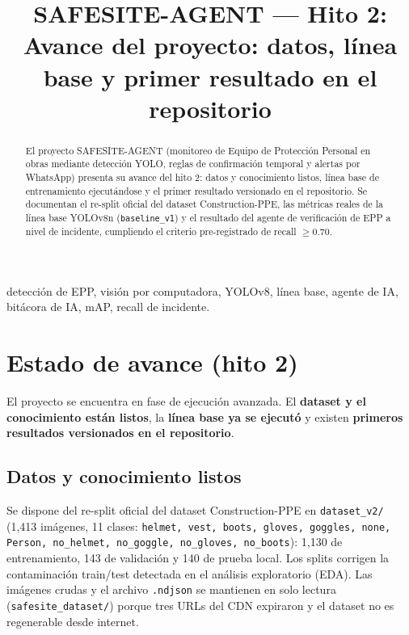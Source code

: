 \documentclass[conference,spanish]{IEEEtran}
\begin{document}
\title{SAFESITE-AGENT --- Hito 2:\\
\small Avance del proyecto: datos, línea base y primer resultado en el repositorio}

\author{
}

\maketitle

\begin{abstract}
El proyecto SAFESITE-AGENT (monitoreo de Equipo de Protección Personal en obras mediante detección YOLO, reglas de confirmación temporal y alertas por WhatsApp) presenta su avance del hito 2: datos y conocimiento listos, línea base de entrenamiento ejecutándose y el primer resultado versionado en el repositorio. Se documentan el re-split oficial del dataset Construction-PPE, las métricas reales de la línea base YOLOv8n (\texttt{baseline\_v1}) y el resultado del agente de verificación de EPP a nivel de incidente, cumpliendo el criterio pre-registrado de recall $\geq 0.70$.
\end{abstract}

\begin{IEEEkeywords}
detección de EPP, visión por computadora, YOLOv8, línea base, agente de IA, bitácora de IA, mAP, recall de incidente.
\end{IEEEkeywords}

\section{Estado de avance (hito 2)}

El proyecto se encuentra en fase de ejecución avanzada. El \textbf{dataset y el conocimiento están listos}, la \textbf{línea base ya se ejecutó} y existen \textbf{primeros resultados versionados en el repositorio}.

\subsection{Datos y conocimiento listos}
Se dispone del re-split oficial del dataset Construction-PPE en \texttt{dataset\_v2/} (1,413 imágenes, 11 clases: \texttt{helmet, vest, boots, gloves, goggles, none, Person, no\_helmet, no\_goggle, no\_gloves, no\_boots}): 1,130 de entrenamiento, 143 de validación y 140 de prueba local. Los splits corrigen la contaminación train/test detectada en el análisis exploratorio (EDA). Las imágenes crudas y el archivo \texttt{.ndjson} se mantienen en solo lectura (\texttt{safesite\_dataset/}) porque tres URLs del CDN expiraron y el dataset no es regenerable desde internet.
\end{document}
